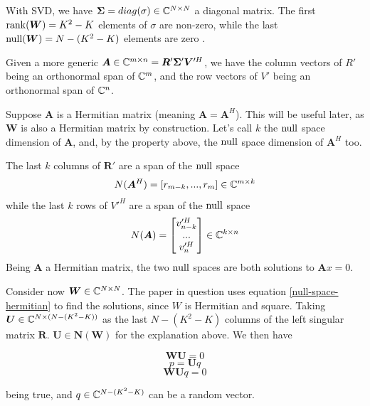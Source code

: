 With SVD, we have $\bm{\Sigma} = diag(\sigma) \in \mathbb{C}^{N \times N}$ a diagonal matrix. The first $\operatorname{rank}(\bm{W}) = K^2-K$ elements of $\sigma$ are non-zero, while the last $\operatorname{null}(\bm{W}) = N - (K^2-K)$ elements are zero \cite{svd}.

Given a more generic $\bm{A} \in \mathbb{C}^{m \times n} = \bm{R}'\bm{ \Sigma}' \bm{V}'^H$, we have the column vectors of $R'$ being an orthonormal span of $\mathbb{C}^m$, and the row vectors of $V'$ being an orthonormal span of $\mathbb{C}^n$.

Suppose $\bm{A}$ is a Hermitian matrix (meaning $\bm{A} = \bm{A}^H$). This will be useful later, as $\bm{W}$ is also a Hermitian matrix by construction. Let's call $k$ the $\operatorname{null}$ space dimension of $\bm{A}$, and, by the property above, the $\operatorname{null}$ space dimension of $\bm{A}^H$ too.

The last $k$ columns of $\bm{R}'$ are a span of the $\operatorname{null}$ space
\begin{equation}
  N(\bm{A}^H) = [r_{m-k}, ..., r_m ] \in \mathbb{C}^{m \times k}
  \label{null-space-hermitian}
\end{equation}
while the last $k$ rows of $V'^H$ are a span of the $\operatorname{null}$ space
\begin{equation}
  N(\bm{A}) = \begin{bmatrix} v'^H_{n-k} \\ ... \\ v'^H_n \end{bmatrix} \in \mathbb{C}^{k \times n}
  \label{null-space-normal}
\end{equation}
Being $\bm{A}$ a Hermitian matrix, the two $\operatorname{null}$ spaces are both solutions to $\bm{A}x = 0$.

Consider now $\bm{W} \in \mathbb{C}^{N \times N}$. The paper in question uses equation \eqref{null-space-hermitian} to find the solutions, since $W$ is Hermitian and square. Taking $\bm{U} \in \mathbb{C} ^ {N \times (N-(K^2 - K))}$ as the last $N-(K^2 - K)$ columns of the left singular matrix $\bm{R}$. $\bm{U} \in \bm{N}(\bm{W})$ for the explanation above. We then have

\begin{equation}\bm{WU} = 0\end{equation}
\begin{equation}p = \bm{U}q\end{equation}
\begin{equation}
  \bm{WU}q = 0
  \label{q_random_vector}
\end{equation}

being true, and $q \in \mathbb{C}^{N-(K^2 - K)}$ can be a random vector.

